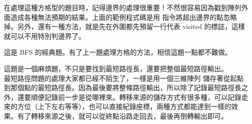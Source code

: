 在處理這種方格型的題目時，記得邊界的處理很重要！不然很容易因為戳到陣列外面造成各種無法預期的結果。上面的範例程式碼是用  指令將超出邊界的點忽略掉。另外，還有一種方法，就是先在外圍都先預留一行代表 visited 的標誌，這樣就可以不用特別判邊界了。\\


這是 BFS 的經典題。有了上一題處理方格的方法，相信這題一點都不難做。\\


這題是一個麻煩題，不只是要找到最短路徑長，還要把整個最短路徑輸出。\\

最短路徑問題的處理大家都已經不陌生了，一樣是用一個三維陣列  儲存著從起點到那個點的最短路徑長。因為最後要將整條路徑輸出，所以除了記錄最短路徑長之外，還要順便記錄前一步是從哪裡來。轉移來源的儲存方式有很多種，可以記錄走來的方位（上下左右等等），也可以直接紀錄座標，兩種方式都能達到一樣的效果。有了轉移來源之後，就可以從終點沿路走回去，最後再倒轉輸出即可。\\

